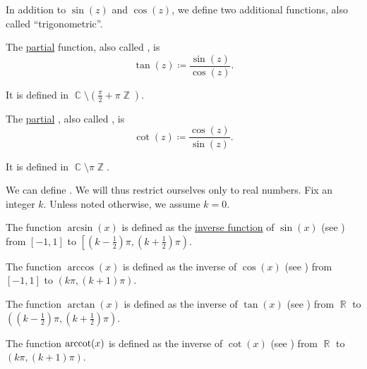 \begin{definition}\label{def:derived_trigonometric_functions}
  In addition to \( \sin(z) \) and \( \cos(z) \), we define two additional functions, also called \enquote{trigonometric}.

  \begin{thmenum}
     The \hyperref[def:set_valued_map/partial]{partial}  function, also called , is
    \begin{equation*}
      \tan(z) \coloneqq \frac {\sin(z)} {\cos(z)}.
    \end{equation*}

    It is defined in \( \BbbC \setminus (\tfrac \pi 2 + \pi\BbbZ) \).

     The \hyperref[def:set_valued_map/partial]{partial} , also called , is
    \begin{equation*}
      \cot(z) \coloneqq \frac {\cos(z)} {\sin(z)}.
    \end{equation*}

    It is defined in \( \BbbC \setminus \pi\BbbZ \).
  \end{thmenum}
\end{definition}

\begin{definition}\label{def:inverse_trigonometric_functions}
  We can define . We will thus restrict ourselves only to real numbers. Fix an integer \( k \). Unless noted otherwise, we assume \( k = 0 \).

  \begin{thmenum}
     The  function \( \arcsin(x) \) is defined as the \hyperref[def:set_valued_map/inverse]{inverse function} of \( \sin(x) \) (see ) from \( [-1, 1] \) to \( \left[(k - \tfrac 1 2) \pi, (k + \tfrac 1 2) \pi \right) \).

     The  function \( \arccos(x) \) is defined as the inverse of \( \cos(x) \) (see ) from \( [-1, 1] \) to \( (k\pi, (k + 1)\pi) \).

     The  function \( \arctan(x) \) is defined as the inverse of \( \tan(x) \) (see ) from \( \BbbR \) to \( \left((k - \tfrac 1 2) \pi, (k + \tfrac 1 2) \pi \right) \).

     The  function \( \operatorname{arccot}(x) \) is defined as the inverse of \( \cot(x) \) (see ) from \( \BbbR \) to \( (k\pi, (k + 1)\pi) \).
  \end{thmenum}
\end{definition}

